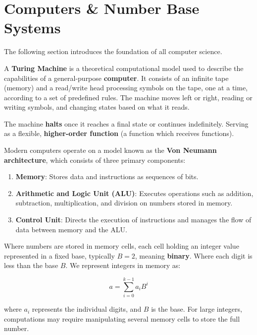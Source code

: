 \section{Computers \& Number Base Systems}
    \noindent 
   The following section introduces the foundation of all computer science.
 

\begin{Def}

    A \textbf{Turing Machine} is a theoretical computational model used to describe the capabilities of a general-purpose \textbf{computer}. It consists of an infinite tape (memory) and a read/write head processing symbols on the tape, one at a time, according to a set of predefined rules. The machine moves left or right, reading or writing symbols, and changing states based on what it reads. 
    
    The machine \textbf{halts} once it reaches a final state or continues indefinitely. Serving as a flexible, \textbf{higher-order function} (a function which receives functions).
\end{Def}

\begin{Def}

    Modern computers operate on a model known as the \textbf{Von Neumann architecture}, which consists of three primary components:
    \begin{enumerate}
        \item \textbf{Memory}: Stores data and instructions as sequences of bits.
        \item \textbf{Arithmetic and Logic Unit (ALU)}: Executes operations such as addition, subtraction, multiplication, and division on numbers stored in memory.
        \item \textbf{Control Unit}: Directs the execution of instructions and manages the flow of data between memory and the ALU.
    \end{enumerate}
    
    Where numbers are stored in memory cells, each cell holding an integer value represented in a fixed base, typically \(B = 2\), meaning \textbf{binary}. Where each digit is less than the base \(B\). We represent integers in memory as:
    
    \[
    a = \sum_{i=0}^{k-1} a_i B^i
    \]
    
    where \( a_i \) represents the individual digits, and \(B\) is the base. For large integers, computations may require manipulating several memory cells to store the full number.
\end{Def}

